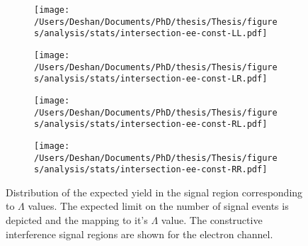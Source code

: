 \begin{figure}[h!]
    \centering
    \begin{subfigure}[b]{0.49\textwidth}
        \centering
        \texttt{[image: /Users/Deshan/Documents/PhD/thesis/Thesis/figures/analysis/stats/intersection-ee-const-LL.pdf]}
        \label{fig:bkgmodel:interpee1}
    \end{subfigure}
    \begin{subfigure}[b]{0.49\textwidth}
        \centering
        \texttt{[image: /Users/Deshan/Documents/PhD/thesis/Thesis/figures/analysis/stats/intersection-ee-const-LR.pdf]}
        \label{fig:bkgmodel:interpee2}
    \end{subfigure}
    \begin{subfigure}[b]{0.49\textwidth}
        \centering
        \texttt{[image: /Users/Deshan/Documents/PhD/thesis/Thesis/figures/analysis/stats/intersection-ee-const-RL.pdf]}
        \label{fig:bkgmodel:interpee3}
    \end{subfigure}
    \begin{subfigure}[b]{0.49\textwidth}
        \centering
        \texttt{[image: /Users/Deshan/Documents/PhD/thesis/Thesis/figures/analysis/stats/intersection-ee-const-RR.pdf]}
        \label{fig:bkgmodel:interpee4}
    \end{subfigure}
    \caption{Distribution of the expected yield in the signal region corresponding to $\Lambda$ values. The expected limit on the number of signal events is depicted and the mapping to it's $\Lambda$ value. The constructive interference signal regions are shown for the electron channel.}
    \label{fig:stats:interpeeconst}
\end{figure}


